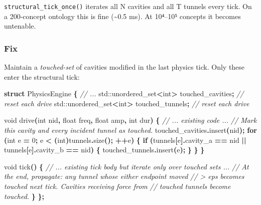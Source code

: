 \documentclass[
  11pt,
  a4paper,
]{article}
\newenvironment{Shaded}{\begin{snugshade}}{\end{snugshade}}
\newcommand{\BuiltInTok}[1]{#1}
\newcommand{\CommentTok}[1]{\textcolor[rgb]{0.56,0.35,0.01}{\textit{#1}}}
\newcommand{\ControlFlowTok}[1]{\textcolor[rgb]{0.13,0.29,0.53}{\textbf{#1}}}
\newcommand{\DataTypeTok}[1]{\textcolor[rgb]{0.13,0.29,0.53}{#1}}
\newcommand{\DecValTok}[1]{\textcolor[rgb]{0.00,0.00,0.81}{#1}}
\newcommand{\KeywordTok}[1]{\textcolor[rgb]{0.13,0.29,0.53}{\textbf{#1}}}
\newcommand{\NormalTok}[1]{#1}
\newcommand{\OperatorTok}[1]{\textcolor[rgb]{0.81,0.36,0.00}{\textbf{#1}}}
\begin{document}
\texttt{structural\_tick\_once()} iterates all N cavities and all T
tunnels every tick. On a 200-concept ontology this is fine
(\textasciitilde0.5 ms). At 10⁴--10⁵ concepts it becomes untenable.

\subsubsection{Fix}\label{fix-3}

Maintain a \emph{touched-set} of cavities modified in the last physics
tick. Only these enter the structural tick:

\begin{Shaded}
\begin{Highlighting}[]
\KeywordTok{struct}\NormalTok{ PhysicsEngine }\OperatorTok{\{}
    \CommentTok{// ...}
    \BuiltInTok{std::}\NormalTok{unordered\_set}\OperatorTok{\textless{}}\DataTypeTok{int}\OperatorTok{\textgreater{}}\NormalTok{ touched\_cavities}\OperatorTok{;}    \CommentTok{// reset each drive}
    \BuiltInTok{std::}\NormalTok{unordered\_set}\OperatorTok{\textless{}}\DataTypeTok{int}\OperatorTok{\textgreater{}}\NormalTok{ touched\_tunnels}\OperatorTok{;}     \CommentTok{// reset each drive}

    \DataTypeTok{void}\NormalTok{ drive}\OperatorTok{(}\DataTypeTok{int}\NormalTok{ nid}\OperatorTok{,} \DataTypeTok{float}\NormalTok{ freq}\OperatorTok{,} \DataTypeTok{float}\NormalTok{ amp}\OperatorTok{,} \DataTypeTok{int}\NormalTok{ dur}\OperatorTok{)} \OperatorTok{\{}
        \CommentTok{// ... existing code ...}
        \CommentTok{// Mark this cavity and every incident tunnel as touched.}
\NormalTok{        touched\_cavities}\OperatorTok{.}\NormalTok{insert}\OperatorTok{(}\NormalTok{nid}\OperatorTok{);}
        \ControlFlowTok{for} \OperatorTok{(}\DataTypeTok{int}\NormalTok{ e }\OperatorTok{=} \DecValTok{0}\OperatorTok{;}\NormalTok{ e }\OperatorTok{\textless{}} \OperatorTok{(}\DataTypeTok{int}\OperatorTok{)}\NormalTok{tunnels}\OperatorTok{.}\NormalTok{size}\OperatorTok{();} \OperatorTok{++}\NormalTok{e}\OperatorTok{)} \OperatorTok{\{}
            \ControlFlowTok{if} \OperatorTok{(}\NormalTok{tunnels}\OperatorTok{[}\NormalTok{e}\OperatorTok{].}\NormalTok{cavity\_a }\OperatorTok{==}\NormalTok{ nid }\OperatorTok{||}\NormalTok{ tunnels}\OperatorTok{[}\NormalTok{e}\OperatorTok{].}\NormalTok{cavity\_b }\OperatorTok{==}\NormalTok{ nid}\OperatorTok{)} \OperatorTok{\{}
\NormalTok{                touched\_tunnels}\OperatorTok{.}\NormalTok{insert}\OperatorTok{(}\NormalTok{e}\OperatorTok{);}
            \OperatorTok{\}}
        \OperatorTok{\}}
    \OperatorTok{\}}

    \DataTypeTok{void}\NormalTok{ tick}\OperatorTok{()} \OperatorTok{\{}
        \CommentTok{// ... existing tick body but iterate only over touched sets ...}
        \CommentTok{// At the end, propagate: any tunnel whose either endpoint moved}
        \CommentTok{// \textgreater{} eps becomes touched next tick. Cavities receiving force from}
        \CommentTok{// touched tunnels become touched.}
    \OperatorTok{\}}
\OperatorTok{\};}
\end{Highlighting}
\end{Shaded}
\end{document}
